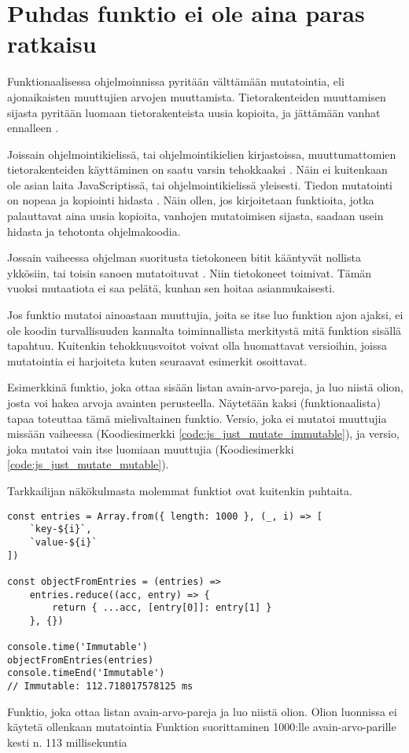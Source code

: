 \section{Puhdas funktio ei ole aina paras ratkaisu}

Funktionaalisessa ohjelmoinnissa pyritään välttämään mutatointia, eli ajonaikaisten muuttujien arvojen muuttamista. Tietorakenteiden muuttamisen sijasta pyritään luomaan tietorakenteista uusia kopioita, ja jättämään vanhat ennalleen \cite{immutablejs_immutable}.

Joissain ohjelmointikielissä, tai ohjelmointikielien kirjastoissa, muuttumattomien tietorakenteiden käyttäminen on saatu varsin tehokkaaksi \cite{hickey_persistent_2009,immutablejs_immutable}. Näin ei kuitenkaan ole asian laita JavaScriptissä, tai ohjelmointikielissä yleisesti. Tiedon mutatointi on nopeaa ja kopiointi hidasta \cite{turner_trauring_copying_2020}. Näin ollen, jos kirjoitetaan funktioita, jotka palauttavat aina uusia kopioita, vanhojen mutatoimisen sijasta, saadaan usein hidasta ja tehotonta ohjelmakoodia.

Jossain vaiheessa ohjelman suoritusta tietokoneen bitit kääntyvät nollista ykkösiin, tai toisin sanoen mutatoituvat \cite{is_reduce_bad}. Niin tietokoneet toimivat. Tämän vuoksi mutaatiota ei saa pelätä, kunhan sen hoitaa asianmukaisesti.

Jos funktio mutatoi ainoastaan muuttujia, joita se itse luo funktion ajon ajaksi, ei ole koodin turvallisuuden kannalta toiminnallista merkitystä mitä funktion sisällä tapahtuu. Kuitenkin tehokkuusvoitot voivat olla huomattavat versioihin, joissa mutatointia ei harjoiteta kuten seuraavat esimerkit osoittavat.

Esimerkkinä funktio, joka ottaa sisään listan avain-arvo-pareja, ja luo niistä olion, josta voi hakea arvoja avainten perusteella. Näytetään kaksi (funktionaalista) tapaa toteuttaa tämä mielivaltainen funktio.
Versio, joka ei mutatoi muuttujia missään vaiheessa (Koodiesimerkki \ref{code:js_just_mutate_immutable}), ja versio, joka mutatoi vain itse luomiaan muuttujia (Koodiesimerkki \ref{code:js_just_mutate_mutable}).

Tarkkailijan näkökulmasta molemmat funktiot ovat kuitenkin puhtaita.

\begin{code}
    \begin{verbatim}
const entries = Array.from({ length: 1000 }, (_, i) => [
    `key-${i}`,
    `value-${i}`
])

const objectFromEntries = (entries) =>
    entries.reduce((acc, entry) => {
        return { ...acc, [entry[0]]: entry[1] }
    }, {})

console.time('Immutable')
objectFromEntries(entries)
console.timeEnd('Immutable')
// Immutable: 112.718017578125 ms
\end{verbatim}
    \caption{Funktio, joka ottaa listan avain-arvo-pareja ja luo niistä olion. Olion luonnissa ei käytetä ollenkaan mutatointia Funktion suorittaminen 1000:lle avain-arvo-parille kesti n. 113 millisekuntia}
    \label{code:js_just_mutate_immutable}
\end{code}


